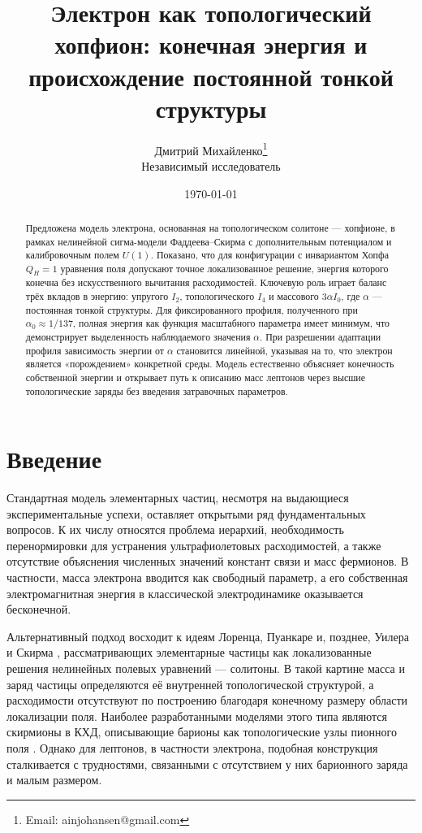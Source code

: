 \documentclass[12pt]{article}
\title{Электрон как топологический хопфион: конечная энергия и происхождение постоянной тонкой структуры}
\author{Дмитрий Михайленко\thanks{Email: ainjohansen@gmail.com} \\
        \small Независимый исследователь}
\date{\today}
\begin{document}
\maketitle

\begin{abstract}
Предложена модель электрона, основанная на топологическом солитоне --- хопфионе, в рамках нелинейной сигма-модели Фаддеева--Скирма с дополнительным потенциалом и калибровочным полем $U(1)$. Показано, что для конфигурации с инвариантом Хопфа $Q_H=1$ уравнения поля допускают точное локализованное решение, энергия которого конечна без искусственного вычитания расходимостей. Ключевую роль играет баланс трёх вкладов в энергию: упругого $I_2$, топологического $I_4$ и массового $3\alpha I_0$, где $\alpha$ --- постоянная тонкой структуры. Для фиксированного профиля, полученного при $\alpha_0\approx1/137$, полная энергия как функция масштабного параметра имеет минимум, что демонстрирует выделенность наблюдаемого значения $\alpha$. При разрешении адаптации профиля зависимость энергии от $\alpha$ становится линейной, указывая на то, что электрон является «порождением» конкретной среды. Модель естественно объясняет конечность собственной энергии и открывает путь к описанию масс лептонов через высшие топологические заряды без введения затравочных параметров.
\end{abstract}

\section{Введение}
Стандартная модель элементарных частиц, несмотря на выдающиеся экспериментальные успехи, оставляет открытыми ряд фундаментальных вопросов. К их числу относятся проблема иерархий, необходимость перенормировки для устранения ультрафиолетовых расходимостей, а также отсутствие объяснения численных значений констант связи и масс фермионов. В частности, масса электрона вводится как свободный параметр, а его собственная электромагнитная энергия в классической электродинамике оказывается бесконечной.

Альтернативный подход восходит к идеям Лоренца, Пуанкаре и, позднее, Уилера и Скирма \cite{Skyrme1962}, рассматривающих элементарные частицы как локализованные решения нелинейных полевых уравнений --- солитоны. В такой картине масса и заряд частицы определяются её внутренней топологической структурой, а расходимости отсутствуют по построению благодаря конечному размеру области локализации поля. Наиболее разработанными моделями этого типа являются скирмионы в КХД, описывающие барионы как топологические узлы пионного поля \cite{Zahed1986}. Однако для лептонов, в частности электрона, подобная конструкция сталкивается с трудностями, связанными с отсутствием у них барионного заряда и малым размером.
\end{document}
